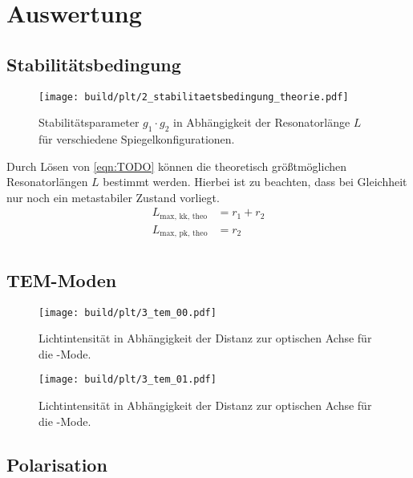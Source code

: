 \section{Auswertung}
\label{sec:auswertung}

\subsection{Stabilitätsbedingung}
\lipsum[1]

\begin{figure}
  \centering
   \texttt{[image: build/plt/2\_stabilitaetsbedingung\_theorie.pdf]}
   \caption{Stabilitätsparameter $g_1 \cdot g_2$ in Abhängigkeit der Resonatorlänge $L$ für verschiedene Spiegelkonfigurationen.}
   \label{fig:plt:stabilitaetsbedingung_theorie}
\end{figure}

Durch Lösen von \autoref{eqn:TODO} können die theoretisch größtmöglichen Resonatorlängen $L$ bestimmt werden.
Hierbei ist zu beachten, dass bei Gleichheit nur noch ein metastabiler Zustand vorliegt.
\begin{align*}
    L_\text{max, kk, theo} &= r_1 + r_2 \\
    L_\text{max, pk, theo} &= r_2 \\
\end{align*}


\subsection{TEM-Moden}
\lipsum[1]

\begin{figure}
  \centering
   \texttt{[image: build/plt/3\_tem\_00.pdf]}
   \caption{Lichtintensität in Abhängigkeit der Distanz zur optischen Achse für die -Mode.}
   \label{fig:plt:tem_00}
\end{figure}

\begin{figure}
  \centering
   \texttt{[image: build/plt/3\_tem\_01.pdf]}
   \caption{Lichtintensität in Abhängigkeit der Distanz zur optischen Achse für die -Mode.}
   \label{fig:plt:tem_01}
\end{figure}


\subsection{Polarisation}
\lipsum[1]

